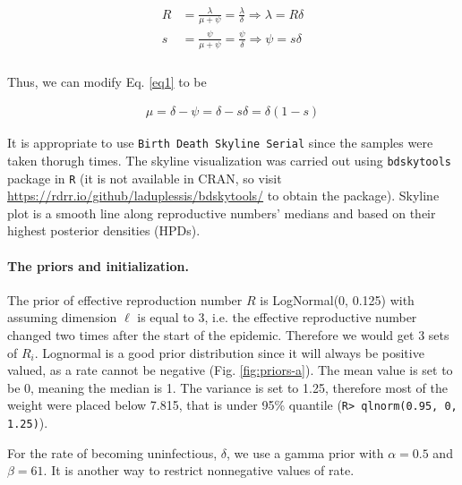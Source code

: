 \documentclass[11pt]{paper}
\begin{document}
	\begin{eqnarray} \label{eq3&4}
	\begin{aligned}
	R &= \frac{\lambda}{\mu + \psi} = \frac{\lambda}{\delta} \Rightarrow \lambda = R \delta\\
	s &= \frac{\psi}{\mu + \psi} = \frac{\psi}{\delta} \Rightarrow \psi = s \delta \\
	\end{aligned}
	\end{eqnarray}
	 
	 Thus, we can modify Eq. \ref{eq1} to be 
	 
	 \begin{eqnarray} \label{eq4}
	 \mu = \delta - \psi = \delta - s\delta = \delta(1 - s)
	 \end{eqnarray}
	
	It is appropriate to use \texttt{Birth Death Skyline Serial} since the samples were taken thorugh times.
	The skyline visualization was carried out using \texttt{bdskytools} package in \texttt{R} (it is not available in CRAN, so visit \url{https://rdrr.io/github/laduplessis/bdskytools/} to obtain the package).
	Skyline plot is a smooth line along reproductive numbers' medians and based on their highest posterior densities (HPDs).
	
\paragraph{The priors and initialization.}
	The prior of effective reproduction number $R$ is LogNormal(0, 0.125) with assuming dimension $\ell$ is equal to 3, i.e. the effective reproductive number changed two times after the start of the epidemic. 
	Therefore we would get 3 sets of $R_i$. 
	Lognormal is a good prior distribution since it will always be positive valued, as a rate cannot be negative (Fig. \ref{fig:priors-a}).
	The mean value is set to be 0, meaning the median is 1. The variance is set to 1.25, therefore most of the weight were placed below 7.815, that is under 95\% quantile (\texttt{R> qlnorm(0.95, 0, 1.25)}).
	
   For the rate of becoming uninfectious, $\delta$, we use a gamma prior with $\alpha = 0.5$ and $\beta = 61$.  It is another way to restrict nonnegative values of rate.
	
\end{document}
